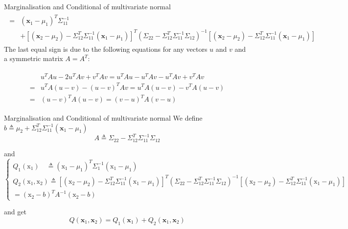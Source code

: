\documentclass{beamer}
\begin{document}
\begin{frame}{Marginalisation and Conditional of multivariate normal}
	\begin{gather}
	\begin{aligned}
	=&\left(\mathbf{x}_{1}-\mu_{1}\right)^{T} \Sigma_{11}^{-1}\\
	&+\left[\left(\mathbf{x}_{2}-\mu_{2}\right)-\Sigma_{12}^{T} \Sigma_{11}^{-1}\left(\mathbf{x}_{1}-\mu_{1}\right)\right]^{T}\left(\Sigma_{22}-\Sigma_{12}^{T} \Sigma_{11}^{-1} \Sigma_{12}\right)^{-1}\left[\left(\mathbf{x}_{2}-\mu_{2}\right)-\Sigma_{12}^{T} \Sigma_{11}^{-1}\left(\mathbf{x}_{1}-\mu_{1}\right)\right]
	\end{aligned}
	\end{gather}
	The last equal sign is due to the following equations for any vectors $u$ and $v$ and a symmetric matrix $A=A^T$:
	
	\begin{gather}
		\begin{aligned}
		& u^{T} A u-2 u^{T} A v+v^{T} A v=u^{T} A u-u^{T} A v-u^{T} A v+v^{T} A v \\
		=& u^{T} A(u-v)-(u-v)^{T} A v=u^{T} A(u-v)-v^{T} A(u-v) \\
		=&(u-v)^{T} A(u-v)=(v-u)^{T} A(v-u)
		\end{aligned} 
	\end{gather}
\end{frame}

\begin{frame}{Marginalisation and Conditional of multivariate normal}
	We define  
	$b \triangleq \mu_{2}+\Sigma_{12}^{T} \Sigma_{11}^{-1}\left(\mathbf{x}_{1}-\mu_{1}\right)$
	\[
	A \triangleq \Sigma_{22}-\Sigma_{12}^{T} \Sigma_{11}^{-1} \Sigma_{12}
	\]
	
	and 
	$$\left\{\begin{array}{l}{Q_{1}\left(\mathrm{x}_{1}\right) \quad \triangleq\left(\mathrm{x}_{1}-\mu_{1}\right)^{T} \Sigma_{1}^{-1}\left(\mathrm{x}_{1}-\mu_{1}\right)} \\ {Q_{2}\left(\mathrm{x}_{1}, \mathrm{x}_{2}\right) \triangleq\left[\left(\mathrm{x}_{2}-\mu_{2}\right)-\Sigma_{12}^{T} \Sigma_{11}^{-1}\left(\mathrm{x}_{1}-\mu_{1}\right)\right]^{T}\left(\Sigma_{22}-\Sigma_{12}^{T} \Sigma_{11}^{-1} \Sigma_{12}\right)^{-1}\left[\left(\mathrm{x}_{2}-\mu_{2}\right)-\Sigma_{12}^{T} \Sigma_{11}^{-1}\left(\mathrm{x}_{1}-\mu_{1}\right)\right]} \\ {=\left(\mathrm{x}_{2}-b\right)^{T} A^{-1}\left(\mathrm{x}_{2}-b\right)}\end{array}\right.$$
	
	and get 
	$$Q\left(\mathbf{x}_{1}, \mathbf{x}_{2}\right)=Q_{1}\left(\mathbf{x}_{1}\right)+Q_{2}\left(\mathbf{x}_{1}, \mathbf{x}_{2}\right)$$
\end{frame}
\end{document}
